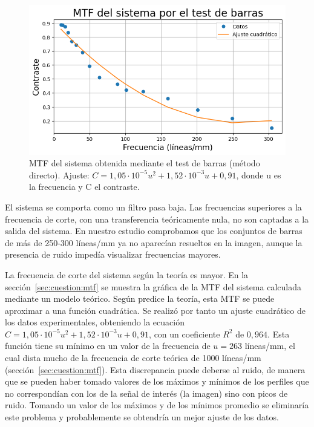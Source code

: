 \documentclass{./packages/optica-article}
\begin{document}
\begin{figure}
	\centering
	\includegraphics[scale=0.5]{MTF-directo.png}
	\caption{MTF del sistema obtenida mediante el test de barras (método directo). Ajuste: $C = 1,05 \cdot 10^{-5} u^2 + 1,52 \cdot 10^{-3} u + 0,91$, donde u es la frecuencia y C el contraste.}
	\label{fig:mtf-directo}
\end{figure}

El sistema se comporta como un filtro pasa baja. Las frecuencias superiores a la frecuencia de corte, con una transferencia teóricamente nula, no son captadas a la salida del sistema. En nuestro estudio comprobamos que los conjuntos de barras de más de 250-300 líneas/mm ya no aparecían resueltos en la imagen, aunque la presencia de ruido impedía visualizar frecuencias mayores.

La frecuencia de corte del sistema según la teoría es mayor. En la sección~\ref{sec:cuestion:mtf} se muestra la gráfica de la MTF del sistema calculada mediante un modelo teórico. Según predice la teoría, esta MTF se puede aproximar a una función cuadrática. Se realizó por tanto un ajuste cuadrático de los datos experimentales, obteniendo la ecuación $C = 1,05 \cdot 10^{-5} u^2 + 1,52 \cdot 10^{-3} u + 0,91$, con un coeficiente $R^2$ de $0,964$. Esta función tiene su mínimo en un valor de la frecuencia de $u = 263$ líneas/mm, el cual dista mucho de la frecuencia de corte teórica de 1000 líneas/mm (sección~\ref{sec:cuestion:mtf}). Esta discrepancia puede deberse al ruido, de manera que se pueden haber tomado valores de los máximos y mínimos de los perfiles que no correspondían con los de la señal de interés (la imagen) sino con picos de ruido. Tomando un valor de los máximos y de los mínimos promedio se eliminaría este problema y probablemente se obtendría un mejor ajuste de los datos.
\end{document}
